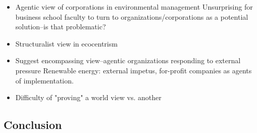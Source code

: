 \documentclass{article}
\begin{document}
	\begin{itemize}
		\item Agentic view of corporations in environmental management
			\subitem Unsurprising for business school faculty to turn to organizations/corporations as a potential solution--is that problematic?
		\item Structuralist view in ecocentrism
		\item Suggest encompassing view--agentic organizations responding to external pressure
			\subitem Renewable energy: external impetus, for-profit companies as agents of implementation.
		\item Difficulty of "proving" a world view vs. another
			\subitem \citet{Giddens1979}
	\end{itemize}

	\subsection*{Conclusion}
\end{document}
